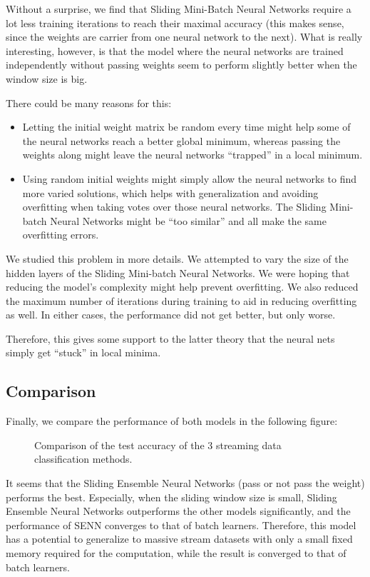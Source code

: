 \documentclass[conference]{IEEEtran}
\begin{document}
		Without a surprise, we find that Sliding Mini-Batch Neural Networks require a lot less training iterations to reach their maximal accuracy (this makes sense, since the weights are carrier from one neural network to the next). What is really interesting, however, is that the model where the neural networks are trained independently without passing weights seem to perform slightly better when the window size is big.
		
		There could be many reasons for this:
		\begin{itemize}
			\item Letting the initial weight matrix be random every time might help some of the neural networks reach a better global minimum, whereas passing the weights along might leave the neural networks ``trapped'' in a local minimum.
			\item Using random initial weights might simply allow the neural networks to find more varied solutions, which helps with generalization and avoiding overfitting when taking votes over those neural networks. The Sliding Mini-batch Neural Networks might be ``too similar'' and all make the same overfitting errors.
		\end{itemize}
		
		We studied this problem in more details. We attempted to vary the size of the hidden layers of the Sliding Mini-batch Neural Networks. We were hoping that reducing the model's complexity might help prevent overfitting. We also reduced the maximum number of iterations during training to aid in reducing overfitting as well. In either cases, the performance did not get better, but only worse.
		
		Therefore, this gives some support to the latter theory that the neural nets simply get ``stuck'' in local minima.
		
		\subsection{Comparison} 
		
		Finally, we compare the performance of both models in the following figure:
		\begin{figure}[H]
			\centering
			\caption{Comparison of the test accuracy of the 3 streaming data classification methods.}
			\label{fig:results-trees-ensemble}
		\end{figure}
		It seems that the Sliding Ensemble Neural Networks (pass or not pass the weight) performs the best. Especially, when the sliding window size is small, Sliding Ensemble Neural Networks outperforms  the other models significantly, and the performance of SENN converges to that of batch learners. Therefore, this model has a potential to generalize to massive stream datasets with only a small fixed memory required for the computation, while the result is converged to that of batch learners.
		
\end{document}
